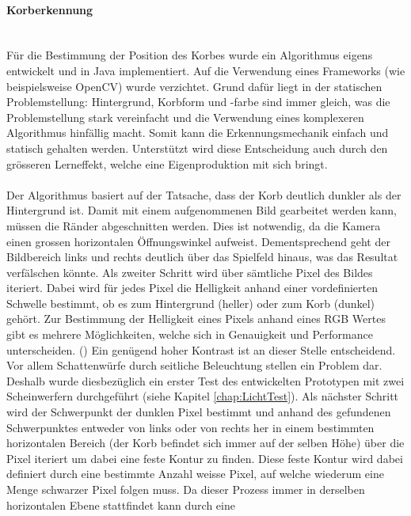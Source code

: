 	\paragraph{Korberkennung}$~~$\vspace{2mm}\\
		Für die Bestimmung der Position des Korbes wurde ein Algorithmus 
		eigens entwickelt und in Java implementiert. Auf die Verwendung eines 
		Frameworks (wie beispielsweise OpenCV) wurde verzichtet. Grund dafür 
		liegt in der statischen Problemstellung: Hintergrund, Korbform und -farbe 
		sind immer gleich, was die Problemstellung stark vereinfacht und die Verwendung eines komplexeren Algorithmus hinfällig macht. Somit kann die Erkennungsmechanik einfach und statisch gehalten werden. Unterstützt wird diese Entscheidung auch durch den grösseren Lerneffekt, welche eine Eigenproduktion mit sich bringt. \\
		\\
		Der Algorithmus 
		basiert auf der Tatsache, dass der Korb deutlich dunkler als der 
		Hintergrund ist. Damit mit einem aufgenommenen Bild gearbeitet werden kann, 
		müssen die Ränder abgeschnitten werden. Dies ist notwendig, da die Kamera einen 
		grossen horizontalen Öffnungswinkel aufweist. Dementsprechend geht der 
		Bildbereich links und rechts deutlich über das Spielfeld 
		hinaus, was das Resultat verfälschen könnte. Als zweiter Schritt wird 
		über sämtliche Pixel des Bildes iteriert. Dabei wird für jedes Pixel die 
		Helligkeit anhand einer vordefinierten Schwelle bestimmt, ob es zum 
		Hintergrund (heller) oder zum Korb (dunkel) gehört. Zur Bestimmung der Helligkeit eines Pixels anhand eines RGB Wertes gibt es mehrere Möglichkeiten, welche sich in Genauigkeit und Performance unterscheiden. (\cite{S:RGB}) Ein genügend hoher 
		Kontrast ist an dieser Stelle entscheidend. Vor allem Schattenwürfe durch 
		seitliche Beleuchtung stellen ein Problem dar. Deshalb wurde diesbezüglich 
		ein erster Test des entwickelten Prototypen mit zwei Scheinwerfern 
		durchgeführt (siehe Kapitel \ref{chap:LichtTest}). Als nächster Schritt 
		wird der Schwerpunkt der dunklen Pixel bestimmt und anhand des gefundenen 
		Schwerpunktes entweder von links oder von rechts her in einem bestimmten 
		horizontalen Bereich (der Korb befindet sich immer auf der selben Höhe)
		über die Pixel iteriert um dabei eine feste Kontur zu finden. Diese feste 
		Kontur wird dabei definiert durch eine bestimmte Anzahl weisse Pixel, auf 
		welche wiederum eine Menge schwarzer Pixel folgen muss. Da dieser Prozess 
		immer in derselben horizontalen Ebene stattfindet kann durch eine 

